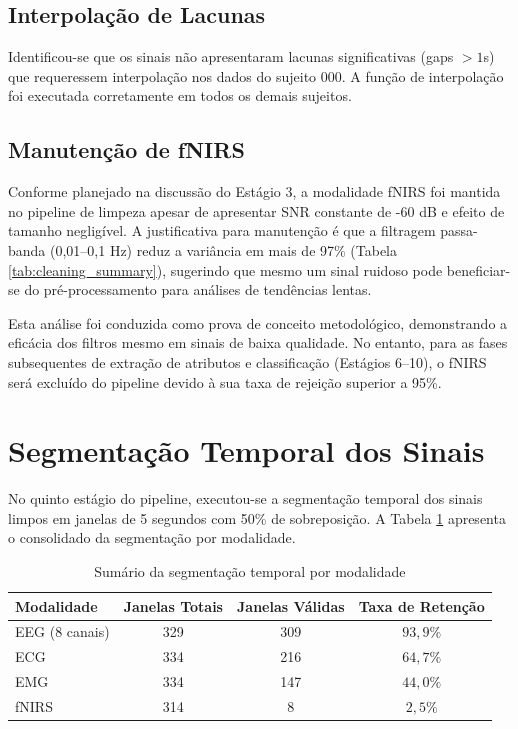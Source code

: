\subsection{Interpolação de Lacunas}

Identificou-se que os sinais não apresentaram lacunas significativas (gaps $> 1$s) que requeressem interpolação nos dados do sujeito 000. A função de interpolação foi executada corretamente em todos os demais sujeitos.

\subsection{Manutenção de fNIRS}

Conforme planejado na discussão do Estágio 3, a modalidade fNIRS foi mantida no pipeline de limpeza apesar de apresentar SNR constante de -60 dB e efeito de tamanho negligível. A justificativa para manutenção é que a filtragem passa-banda (0,01--0,1 Hz) reduz a variância em mais de 97\% (Tabela \ref{tab:cleaning_summary}), sugerindo que mesmo um sinal ruidoso pode beneficiar-se do pré-processamento para análises de tendências lentas.

Esta análise foi conduzida como prova de conceito metodológico, demonstrando a eficácia dos filtros mesmo em sinais de baixa qualidade. No entanto, para as fases subsequentes de extração de atributos e classificação (Estágios 6--10), o fNIRS será excluído do pipeline devido à sua taxa de rejeição superior a 95\%.

\section{Segmentação Temporal dos Sinais}
\label{sec:resultados_segmentacao}

No quinto estágio do pipeline, executou-se a segmentação temporal dos sinais limpos em janelas de 5 segundos com 50\% de sobreposição. A Tabela \ref{tab:segmentacao_summary} apresenta o consolidado da segmentação por modalidade.

\begin{table}[htbp]
    \centering
    \caption{Sumário da segmentação temporal por modalidade}
    \label{tab:segmentacao_summary}
    \begin{tabular}{lccc}
        \toprule
        \textbf{Modalidade} & \textbf{Janelas Totais} & \textbf{Janelas Válidas} & \textbf{Taxa de Retenção} \\
        \midrule
        EEG (8 canais) & 329 & 309 & $93{,}9\%$ \\
        ECG & 334 & 216 & $64{,}7\%$ \\
        EMG & 334 & 147 & $44{,}0\%$ \\
        fNIRS & 314 & 8 & $2{,}5\%$ \\
        \bottomrule
    \end{tabular}
\end{table}

